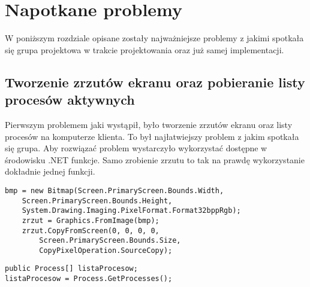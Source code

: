 

\section{Napotkane problemy}

W poniższym rozdziale opisane zostały najważniejsze problemy z jakimi spotkała się grupa projektowa w trakcie projektowania oraz już samej implementacji.
\newline

\subsection{Tworzenie zrzutów ekranu oraz pobieranie listy procesów aktywnych}
Pierwszym problemem jaki wystąpił, było tworzenie zrzutów ekranu oraz listy procesów na komputerze klienta. To był najłatwiejszy problem z jakim spotkała się grupa. Aby rozwiązać problem wystarczyło wykorzystać dostępne w środowisku .NET funkcje. Samo zrobienie zrzutu to tak na prawdę wykorzystanie dokładnie jednej funkcji.

\newline
\begin{lstlisting}[frame=single,captionpos=b,
    caption={Fragment kodu odpowiedzialny za tworzenie zrzutów ekranu},
    label={lst:kod1},
    style=sharpc]
bmp = new Bitmap(Screen.PrimaryScreen.Bounds.Width,
    Screen.PrimaryScreen.Bounds.Height,
    System.Drawing.Imaging.PixelFormat.Format32bppRgb);
    zrzut = Graphics.FromImage(bmp);
    zrzut.CopyFromScreen(0, 0, 0, 0,
        Screen.PrimaryScreen.Bounds.Size,
        CopyPixelOperation.SourceCopy);
\end{lstlisting}

\begin{lstlisting}[frame=single,captionpos=b,
    caption={Fragment kodu odpowiedzialny za pobranie listy aktywnych procesów},
    label={lst:kod1},
    style=sharpc]
public Process[] listaProcesow;
listaProcesow = Process.GetProcesses();
\end{lstlisting}


